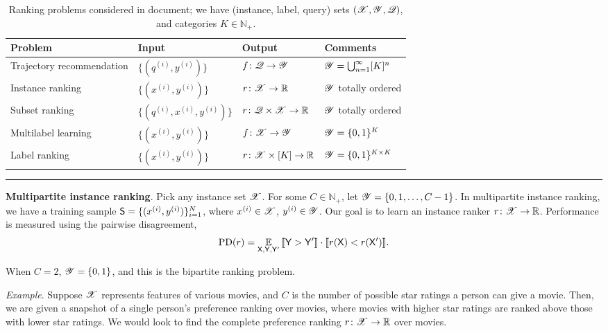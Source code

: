 \begin{table*}[!h]
	\centering
	\renewcommand{\arraystretch}{1.25}
	\begin{tabular}{@{}llll@{}}
		\toprule
		\toprule
		\textbf{Problem} & \textbf{Input} & \textbf{Output} & \textbf{Comments} \\
		\toprule
		Trajectory recommendation & $\{ ( q^{(i)}, y^{(i)} ) \}$ 		 & $f \colon \mathscr{Q} \to \mathscr{Y}$ & $\mathscr{Y} = \bigcup_{n = 1}^\infty [K]^n$ \\
		\midrule
		Instance ranking & $\{ ( x^{(i)}, y^{(i)} ) \}$ 		 & $r \colon \mathscr{X} \to \mathbb{R}$ & $\mathscr{Y}$ totally ordered \\
		Subset ranking 	 & $\{ ( q^{(i)}, x^{(i)}, y^{(i)} ) \}$ & $r \colon \mathscr{Q} \times \mathscr{X} \to \mathbb{R}$ & $\mathscr{Y}$ totally ordered \\
		\midrule
		Multilabel learning & $\{ ( x^{(i)}, y^{(i)} ) \}$ 		 & $f \colon \mathscr{X} \to \mathscr{Y}$ & $\mathscr{Y} = \{ 0, 1 \}^K$ \\
		Label ranking 		& $\{ ( x^{(i)}, y^{(i)} ) \}$ 		 & $r \colon \mathscr{X} \times [K] \to \mathbb{R}$ & $\mathscr{Y} = \{ 0, 1 \}^{K \times K}$ \\
		\bottomrule
	\end{tabular}
	
	\caption{Ranking problems considered in document; we have (instance, label, query) sets $(\mathscr{X},\mathscr{Y},\mathscr{Q})$, and categories $K \in \mathbb{N}_+$.}
	\label{tbl:problems}
\end{table*}

\vspace{12pt}
\hrule
\vspace{12pt}

%
\textbf{Multipartite instance ranking}.
Pick any instance set $\mathscr{X}$.
For some $C \in \mathbb{N}_+$,
let $\mathscr{Y} = \{ 0, 1, \ldots, C - 1 \}$.
In multipartite instance ranking,
we have a training sample $\mathsf{S} = \{ ( x^{(i)}, y^{(i)} ) \}_{i = 1}^N$,
where
$x^{(i)} \in \mathscr{X}$,
$y^{(i)} \in \mathscr{Y}$.
Our goal is to learn an instance ranker $r \colon \mathscr{X} \to \mathbb{R}$.
Performance is measured using the pairwise disagreement,
$$ \mathrm{PD}( r ) = \underset{\mathsf{X}, \mathsf{Y}, \mathsf{Y}'}{\mathbb{E}}\,  \llbracket \mathsf{Y} > \mathsf{Y}' \rrbracket \cdot \llbracket  r( \mathsf{X} ) < r( \mathsf{X}' )  \rrbracket. $$

When $C = 2$, $\mathscr{Y} = \{ 0, 1 \}$, and this is the bipartite ranking problem.

\emph{Example}.
Suppose $\mathscr{X}$ represents features of various movies, and $C$ is the number of possible star ratings a person can give a movie.
Then, we are given a snapshot of a single person's preference ranking over movies,
where movies with higher star ratings are ranked above those with lower star ratings.
We would look to find the complete preference ranking $r \colon \mathscr{X} \to \mathbb{R}$ over movies.


